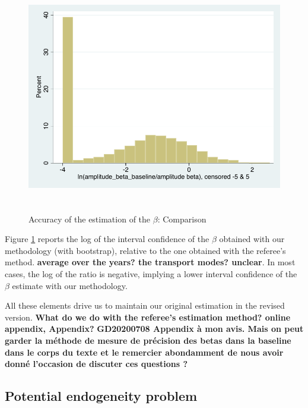\documentclass[a4paper,12pt]{article}
\begin{document}
\begin{itemize}
\begin{itemize}
\begin{figure}[htbp]
\caption{Accuracy of the estimation of the $\beta$: Comparison}
\label{fig:accuracy_beta}
\begin{center}
\includegraphics[height=4in]{accuracy_beta.pdf}
\end{center}
\end{figure}

Figure \ref{fig:accuracy_beta} reports the log of the interval confidence of the $\beta$ obtained with our methodology (with bootstrap), relative to the one obtained with the referee's method. \textbf{average over the years? the transport modes? unclear}. In most cases, the log of the ratio is negative, implying a lower interval confidence of the $\beta$ estimate with our methodology.

\end{itemize}
\end{itemize}

All these elements drive us to maintain our original estimation in the revised version. \textbf{What do we do with the referee's estimation method? online appendix, Appendix?}
\textbf{GD20200708 Appendix à mon avis. Mais on peut garder la méthode de mesure de précision des betas dans la baseline dans le corps du texte et le remercier abondamment de nous avoir donné l’occasion de discuter ces questions ?}




\subsection{Potential endogeneity problem}
\end{document}
